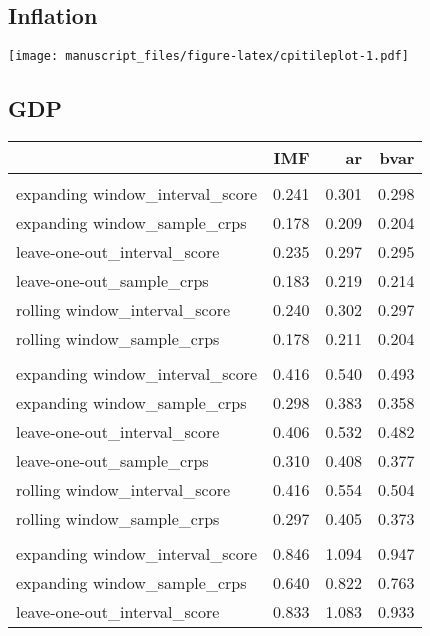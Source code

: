 \documentclass[
]{article}
\begin{document}
\hypertarget{inflation-2}{%
\subsection{Inflation}\label{inflation-2}}

\texttt{[image: manuscript\_files/figure-latex/cpitileplot-1.pdf]}

\hypertarget{gdp-2}{%
\subsection{GDP}\label{gdp-2}}

\begin{longtable}{l|rrr}
\toprule
\multicolumn{1}{l}{} & IMF & ar & bvar \\ 
\midrule\addlinespace[2.5pt]
\multicolumn{4}{l}{horizon = 0} \\ 
\midrule\addlinespace[2.5pt]
expanding window\_interval\_score & 0.241 & 0.301 & 0.298 \\ 
expanding window\_sample\_crps & 0.178 & 0.209 & 0.204 \\ 
leave-one-out\_interval\_score & 0.235 & 0.297 & 0.295 \\ 
leave-one-out\_sample\_crps & 0.183 & 0.219 & 0.214 \\ 
rolling window\_interval\_score & 0.240 & 0.302 & 0.297 \\ 
rolling window\_sample\_crps & 0.178 & 0.211 & 0.204 \\ 
\midrule\addlinespace[2.5pt]
\multicolumn{4}{l}{horizon = 0.5} \\ 
\midrule\addlinespace[2.5pt]
expanding window\_interval\_score & 0.416 & 0.540 & 0.493 \\ 
expanding window\_sample\_crps & 0.298 & 0.383 & 0.358 \\ 
leave-one-out\_interval\_score & 0.406 & 0.532 & 0.482 \\ 
leave-one-out\_sample\_crps & 0.310 & 0.408 & 0.377 \\ 
rolling window\_interval\_score & 0.416 & 0.554 & 0.504 \\ 
rolling window\_sample\_crps & 0.297 & 0.405 & 0.373 \\ 
\midrule\addlinespace[2.5pt]
\multicolumn{4}{l}{horizon = 1} \\ 
\midrule\addlinespace[2.5pt]
expanding window\_interval\_score & 0.846 & 1.094 & 0.947 \\ 
expanding window\_sample\_crps & 0.640 & 0.822 & 0.763 \\ 
leave-one-out\_interval\_score & 0.833 & 1.083 & 0.933 \\ 

\end{longtable}
\end{document}
